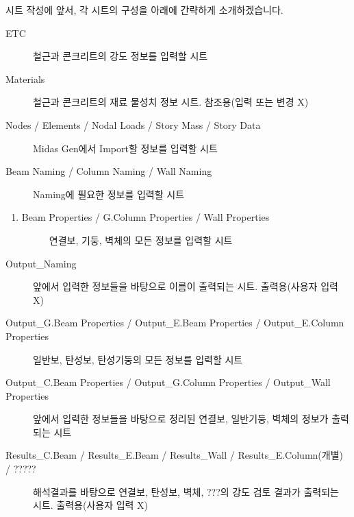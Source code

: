 \documentclass[a4paper,10pt,korean]{sphinxmanual}
\begin{document}
\sphinxAtStartPar
시트 작성에 앞서, 각 시트의 구성을 아래에 간략하게 소개하겠습니다.
\begin{description}
\item[{ETC}] \leavevmode
\sphinxAtStartPar
철근과 콘크리트의 강도 정보를 입력할 시트

\item[{Materials}] \leavevmode
\sphinxAtStartPar
철근과 콘크리트의 재료 물성치 정보 시트.
참조용(입력 또는 변경 X)

\item[{Nodes / Elements / Nodal Loads / Story Mass / Story Data}] \leavevmode
\sphinxAtStartPar
Midas Gen에서 Import할 정보를 입력할 시트

\item[{Beam Naming / Column Naming / Wall Naming}] \leavevmode
\sphinxAtStartPar
Naming에 필요한 정보를 입력할 시트

\end{description}
\begin{enumerate}
%
\setcounter{enumi}{2}
\item {} \begin{description}
\item[{Beam Properties / G.Column Properties / Wall Properties}] \leavevmode
\sphinxAtStartPar
연결보, 기둥, 벽체의 모든 정보를 입력할 시트

\end{description}

\end{enumerate}
\begin{description}
\item[{Output\_Naming}] \leavevmode
\sphinxAtStartPar
앞에서 입력한 정보들을 바탕으로 이름이 출력되는 시트. 출력용(사용자 입력 X)

\item[{Output\_G.Beam Properties / Output\_E.Beam Properties / Output\_E.Column Properties}] \leavevmode
\sphinxAtStartPar
일반보, 탄성보, 탄성기둥의 모든 정보를 입력할 시트

\item[{Output\_C.Beam Properties / Output\_G.Column Properties / Output\_Wall Properties}] \leavevmode
\sphinxAtStartPar
앞에서 입력한 정보들을 바탕으로 정리된 연결보, 일반기둥, 벽체의 정보가 출력되는 시트

\item[{Results\_C.Beam / Results\_E.Beam / Results\_Wall / Results\_E.Column(개별) / ?????}] \leavevmode
\sphinxAtStartPar
해석결과를 바탕으로 연결보, 탄성보, 벽체, ???의 강도 검토 결과가 출력되는 시트. 출력용(사용자 입력 X)

\end{description}
\end{document}
